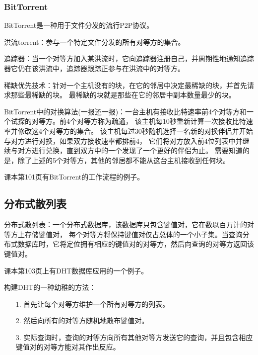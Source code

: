 \documentclass[a4paper,left=2.5cm,right=2.5cm,11pt]{article}
\begin{document}
\subsubsection{BitTorrent}
	BitTorrent是一种用于文件分发的流行P2P协议。\par

	洪流torrent：参与一个特定文件分发的所有对等方的集合。\par

	追踪器：当一个对等方加入某洪流时，它向追踪器注册自己，并周期性地通知追踪器它仍在该洪流中，追踪器跟踪正参与在洪流中的对等方。\par

	稀缺优先技术：针对一个主机没有的块，在它的邻居中决定最稀缺的块，并首先请求那些最稀缺的块。
	最稀缺的块就是那些在它的邻居中副本数量最少的块。\par

	BitTorrent中的对换算法(一报还一报)：一台主机有接收比特速率前4个对等方和一个试探的对等方。前4个对等方称为疏通，
	该主机每10秒重新计算一次接收比特速率并修改这4个对等方的集合。
	该主机每过30秒随机选择一名新的对换伴侣并开始与对方进行对换，如果双方接收速率都排前4，
	它们将对方放入前4位列表中并继续与对方进行兑换，直到双方中的一个发现了一个更好的伴侣为止。
	需要知道的是，除了上述的5个对等方，其他的邻居都不能从这台主机接收到任何块。\par

	课本第101页有BitTorrent的工作流程的例子。

\subsection{分布式散列表}
	分布式散列表：一个分布式数据库，该数据库只包含键值对，它在数以百万计的对等方上存储键值对，
	每个对等方将保持键值对仅占总体的一个小子集。当查询分布式数据库时，它将定位拥有相应的键值对的对等方，然后向查询的对等方返回该键值对。\par

	课本第103页上有DHT数据库应用的一个例子。\par

	构建DHT的一种幼稚的方法：
	\begin{itemize}
		\item[1.] 首先让每个对等方维护一个所有对等方的列表。
		\item[2.] 然后向所有的对等方随机地散布键值对。
		\item[3.] 实际查询时，查询的对等方向所有其他对等方发送它的查询，并且包含相应键值对的对等方能对其作出反应。
	\end{itemize}
\end{document}
